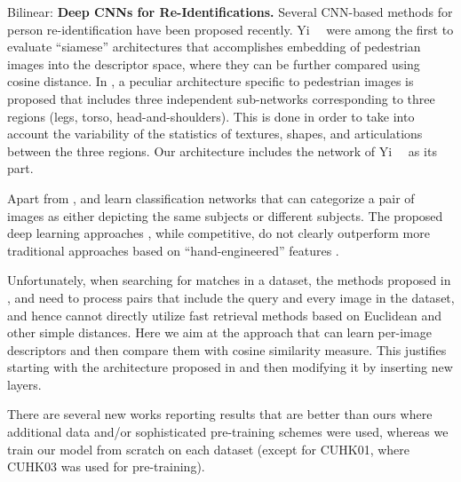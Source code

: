 Bilinear:
\textbf{Deep CNNs for Re-Identifications.} Several CNN-based methods for person re-identification have been proposed recently\cite{li2014deepreid, yi2014deep, ahmed2015improved, chen2015deep, VariorHW16, VariorSLXW16,SuZX0T16, LiuFQJY17, XiaoLOW16}. Yi~\etal~\cite{yi2014deep} were among the first to evaluate ``siamese'' architectures that accomplishes embedding of pedestrian images into the descriptor space, where they can be further compared using cosine distance. In \cite{yi2014deep}, a peculiar architecture specific to pedestrian images is proposed that includes three independent sub-networks corresponding to three regions (legs, torso, head-and-shoulders). This is done in order to take into account the variability of the statistics of textures, shapes, and articulations between the three regions. Our architecture includes the network of  Yi~\etal~\cite{yi2014deep} as its part.

Apart from \cite{yi2014deep}, \cite{li2014deepreid} and \cite{ahmed2015improved} learn classification networks that can categorize a pair of images as either depicting  the same subjects or different subjects. %
The proposed deep learning approaches \cite{ahmed2015improved, yi2014deep, li2014deepreid}, while competitive, do not clearly outperform more traditional approaches based on ``hand-engineered'' features \cite{paisitkriangkrai2015learning, zhao2014person}.

Unfortunately, when searching for matches in a dataset, the methods proposed in \cite{li2014deepreid}, \cite{ahmed2015improved} and \cite{chen2015deep} need to process pairs that include the query and every image in the dataset, and hence cannot directly utilize fast retrieval methods based on Euclidean and other simple distances. Here we aim at the approach that can learn per-image descriptors and then compare them with cosine similarity measure. This justifies starting with the architecture proposed in  \cite{yi2014deep} and then modifying it by inserting new layers.

There are several new works reporting results that are better than ours \cite{LiuFQJY17, XiaoLOW16} where additional data and/or sophisticated pre-training schemes were used, whereas we train our model from scratch on each dataset (except for CUHK01, where CUHK03 was used for pre-training).

